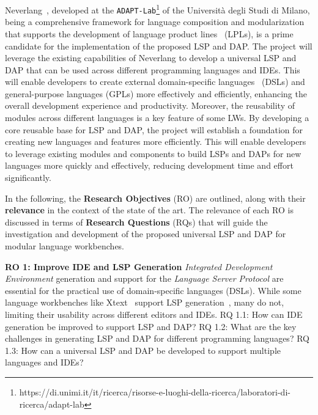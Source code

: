 Neverlang~\cite{Cazzola15c, Cazzola14c}, developed at the \texttt{ADAPT-Lab}\footnote{https://di.unimi.it/it/ricerca/risorse-e-luoghi-della-ricerca/laboratori-di-ricerca/adapt-lab} of the Università degli Studi di Milano, being a comprehensive framework for language composition and modularization that supports the development of language product lines~\cite{Cazzola15f, Cazzola21b} (LPLs), is a prime candidate for the implementation of the proposed LSP and DAP. The project will leverage the existing capabilities of Neverlang to develop a universal LSP and DAP that can be used across different programming languages and IDEs. This will enable developers to create external domain-specific languages~\cite{Fowler10} (DSLs) and general-purpose languages (GPLs) more effectively and efficiently, enhancing the overall development experience and productivity. Moreover, the reusability of modules across different languages is a key feature of some LWs. By developing a core reusable base for LSP and DAP, the project will establish a foundation for creating new languages and features more efficiently. This will enable developers to leverage existing modules and components to build LSPs and DAPs for new languages more quickly and effectively, reducing development time and effort significantly.

\hfill \break
In the following, the \textbf{Research Objectives} (RO) are outlined, along with their \textbf{relevance} in the context of the state of the art. The relevance of each RO is discussed in terms of \textbf{Research Questions} (RQs) that will guide the investigation and development of the proposed universal LSP and DAP for modular language workbenches.

\hfill \break
\noindent
\textbf{\hypertarget{ro1}{RO 1}: Improve IDE and LSP Generation}
\hfill \break
\textit{Integrated Development Environment} generation and support for the \textit{Language Server Protocol} are essential for the practical use of domain-specific languages (DSLs). While some language workbenches like Xtext~\cite{Bettini13b} support LSP generation~\cite{Barros22}, many do not, limiting their usability across different editors and IDEs.
\hfill \break
\textsf{\hypertarget{rq11}{RQ 1.1}}: How can IDE generation be improved to support LSP and DAP?
\hfill \break
\textsf{\hypertarget{rq12}{RQ 1.2}}: What are the key challenges in generating LSP and DAP for different programming languages?
\hfill \break
\textsf{\hypertarget{rq13}{RQ 1.3}}: How can a universal LSP and DAP be developed to support multiple languages and IDEs?

